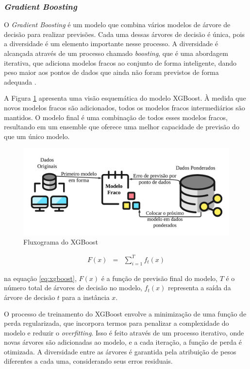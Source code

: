  \subsubsection{\textit{Gradient Boosting}}\label{subsubsec:lgbxgb}
 
 O \textit{Gradient Boosting} é um modelo que combina vários modelos de árvore de decisão para realizar previsões. Cada uma dessas árvores de decisão é única, pois a diversidade é um elemento importante nesse processo. A diversidade é alcançada através de um processo chamado \textit{boosting}, que é uma abordagem iterativa, que adiciona modelos fracos ao conjunto de forma inteligente, dando peso maior aos pontos de dados que ainda não foram previstos de forma adequada \cite{BUEECHI2023109596}. 
 
A Figura \ref{fig:xgboos} apresenta uma visão esquemática do modelo XGBoost. À medida que novos modelos fracos são adicionados, todos os modelos fracos intermediários são mantidos. O modelo final é uma combinação de todos esses modelos fracos, resultando em um ensemble que oferece uma melhor capacidade de previsão do que um único modelo.

\begin{figure}[!htb]
	\centering
	\caption{Fluxograma do XGBoost}
	\label{fig:xgboos}
	\includegraphics[width=\linewidth]{Modelos/Figuras/xgboos.pdf}
\end{figure}
 

 \begin{eqnarray}
 	 F(x) &=& \sum_{i=1}^{T} f_t(x) \label{eq:xgboost}
 \end{eqnarray}

 
\noindent na equação \eqref{eq:xgboost}, $F(x)$ é a função de previsão final do modelo,  $T$ é o número total de árvores de decisão no modelo, $f_t(x)$  representa a saída da árvore de decisão $ t $ para a instância $ x $.
 
 O processo de treinamento do XGBoost envolve a minimização de uma função de perda regularizada, que incorpora termos para penalizar a complexidade do modelo e reduzir o \textit{overfitting}. Isso é feito através de um processo iterativo, onde novas árvores são adicionadas ao modelo, e a cada iteração, a função de perda é otimizada. A diversidade entre as árvores é garantida pela atribuição de pesos diferentes a cada uma, considerando seus erros residuais.
 


